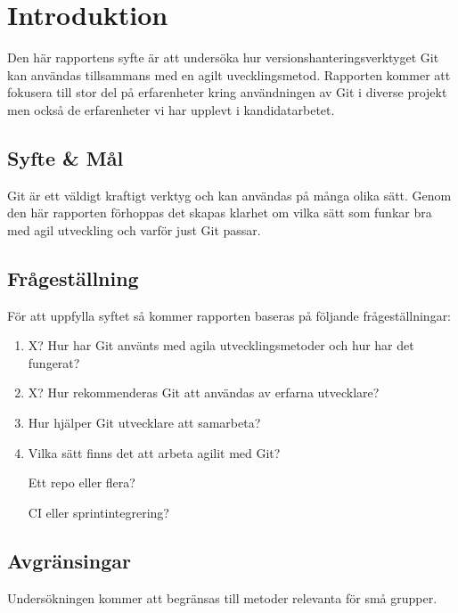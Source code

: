\section{Introduktion}
\label{sec:bjorn-introduction}
Den här rapportens syfte är att undersöka hur versionshanteringsverktyget Git kan användas tillsammans med en agilt uvecklingsmetod. Rapporten kommer att fokusera till stor del på erfarenheter kring användningen av Git i diverse projekt men också de erfarenheter vi har upplevt i kandidatarbetet.

\subsection{Syfte \& Mål}
\label{subsec:motivation}

Git är ett väldigt kraftigt verktyg och kan användas på många olika sätt. Genom den här rapporten förhoppas det skapas klarhet om vilka sätt som funkar bra med agil utveckling och varför just Git passar.

\subsection{Frågeställning}
\label{subsec:research-questions}

För att uppfylla syftet så kommer rapporten baseras på följande frågeställningar:

\begin{enumerate}
\item X? Hur har Git använts med agila utvecklingsmetoder och hur har det fungerat?

\item X? Hur rekommenderas Git att användas av erfarna utvecklare?

\item Hur hjälper Git utvecklare att samarbeta?

\item Vilka sätt finns det att arbeta agilit med Git?

Ett repo eller flera?

CI eller sprintintegrering?



\end{enumerate}

\subsection{Avgränsingar}
\label{subsec:delimitations}

Undersökningen kommer att begränsas till metoder relevanta för små grupper.